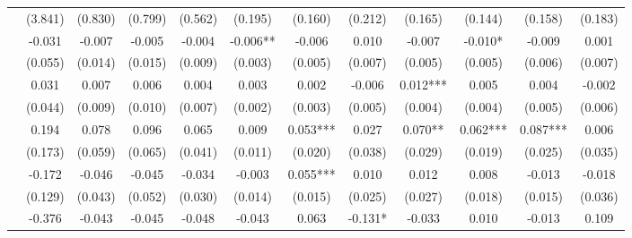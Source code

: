 \begin{table}
\begin{threeparttable}
\begin{tabular}{p{3cm}S@{}S@{}S@{}S@{}S@{}S@{}S@{}S@{}S@{}S@{}S@{}}
                                          &     (3.841)   &     (0.830)   &     (0.799)   &     (0.562)   &     (0.195)   &     (0.160)   &     (0.212)   &     (0.165)   &     (0.144)   &     (0.158)   &     (0.183)   \\
                    &      -0.031   &      -0.007   &      -0.005   &      -0.004   &      -0.006** &      -0.006   &       0.010   &      -0.007   &      -0.010*  &      -0.009   &       0.001   \\
                                          &     (0.055)   &     (0.014)   &     (0.015)   &     (0.009)   &     (0.003)   &     (0.005)   &     (0.007)   &     (0.005)   &     (0.005)   &     (0.006)   &     (0.007)   \\
                    &       0.031   &       0.007   &       0.006   &       0.004   &       0.003   &       0.002   &      -0.006   &       0.012***&       0.005   &       0.004   &      -0.002   \\
                                          &     (0.044)   &     (0.009)   &     (0.010)   &     (0.007)   &     (0.002)   &     (0.003)   &     (0.005)   &     (0.004)   &     (0.004)   &     (0.005)   &     (0.006)   \\
                       &       0.194   &       0.078   &       0.096   &       0.065   &       0.009   &       0.053***&       0.027   &       0.070** &       0.062***&       0.087***&       0.006   \\
                                          &     (0.173)   &     (0.059)   &     (0.065)   &     (0.041)   &     (0.011)   &     (0.020)   &     (0.038)   &     (0.029)   &     (0.019)   &     (0.025)   &     (0.035)   \\
            &      -0.172   &      -0.046   &      -0.045   &      -0.034   &      -0.003   &       0.055***&       0.010   &       0.012   &       0.008   &      -0.013   &      -0.018   \\
                                          &     (0.129)   &     (0.043)   &     (0.052)   &     (0.030)   &     (0.014)   &     (0.015)   &     (0.025)   &     (0.027)   &     (0.018)   &     (0.015)   &     (0.036)   \\
                &      -0.376   &      -0.043   &      -0.045   &      -0.048   &      -0.043   &       0.063   &      -0.131*  &      -0.033   &       0.010   &      -0.013   &       0.109   \\

\end{tabular}
\end{threeparttable}
\end{table}
